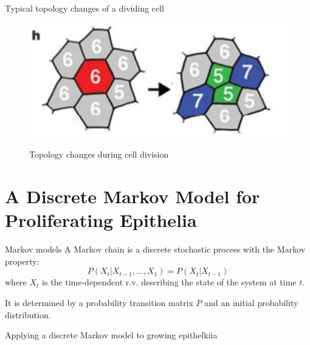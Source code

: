 \documentclass[aspectratio=169, 10pt]{beamer}
\begin{document}
\begin{frame}[fragile]{Typical topology changes of a dividing cell}
  \begin{figure}[]
    \centering
    \caption{Topology changes during cell division}
    \includegraphics[width=.5\textwidth]{presentation/figures/topology_evolution.png} 
    \label{}
  \end{figure}
\end{frame}

\section{A Discrete Markov Model for Proliferating Epithelia}

\begin{frame}[fragile]{Markov models}
    A Markov chain is a discrete stochastic process with the Markov property:
    \begin{equation*}
      P(X_t|X_{t-1},\ldots,X_1)=P(X_t|X_{t-1})
    \end{equation*}
    where $X_t$ is the time-dependent r.v. describing the state of the system at time $t$. 
    
    It is determined by a probability transition matrix $P$ and an initial probability distribution. 

\end{frame}

\begin{frame}[fragile]{Applying a discrete Markov model to growing epithelkiia}
  \begin{columns}
    \column{\textwidth}
    \begin{table}
      \centering
    \end{table}
  \end{columns}
\end{frame}
\end{document}
